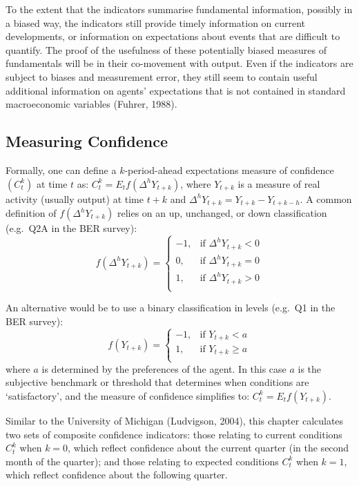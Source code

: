 \documentclass[11pt,]{article}
\begin{document}
To the extent that the indicators summarise fundamental information,
possibly in a biased way, the indicators still provide timely
information on current developments, or information on expectations
about events that are difficult to quantify. The proof of the usefulness
of these potentially biased measures of fundamentals will be in their
co-movement with output. Even if the indicators are subject to biases
and measurement error, they still seem to contain useful additional
information on agents' expectations that is not contained in standard
macroeconomic variables (Fuhrer, 1988).

\subsection{Measuring Confidence}\label{measuring-confidence-1}

Formally, one can define a \(k\)-period-ahead expectations measure of
confidence \((C_t^k)\) at time \(t\) as:
\(C _t^k = E_t f(\Delta^h Y_{t+k})\), where \(Y_{t+k}\) is a measure of
real activity (usually output) at time \(t+k\) and
\(\Delta^h Y_{t+k} = Y_{t+k} - Y_{t+k-h}\). A common definition of
\(f(\Delta^h Y_{t+k})\) relies on an up, unchanged, or down
classification (e.g.~Q2A in the BER survey):
\[ f(\Delta^h Y_{t+k}) = \begin{cases} -1,& \text{if } \Delta^h Y_{t+k} < 0\\ 0,& \text{if } \Delta^h Y_{t+k} = 0\\ 1,& \text{if } \Delta^h Y_{t+k} > 0\\ \end{cases} \]

An alternative would be to use a binary classification in levels
(e.g.~Q1 in the BER survey):
\[ f(Y_{t+k}) = \begin{cases} -1,& \text{if } Y_{t+k} < a\\ 1,& \text{if } Y_{t+k} \geq a\\ \end{cases}\]
where \(a\) is determined by the preferences of the agent. In this case
\(a\) is the subjective benchmark or threshold that determines when
conditions are `satisfactory', and the measure of confidence simplifies
to: \(C _t^k = E_t f(Y_{t+k})\).

Similar to the University of Michigan (Ludvigson, 2004), this chapter
calculates two sets of composite confidence indicators: those relating
to current conditions \(C_t^k\) when \(k=0\), which reflect confidence
about the current quarter (in the second month of the quarter); and
those relating to expected conditions \(C_t^k\) when \(k=1\), which
reflect confidence about the following quarter.
\end{document}
